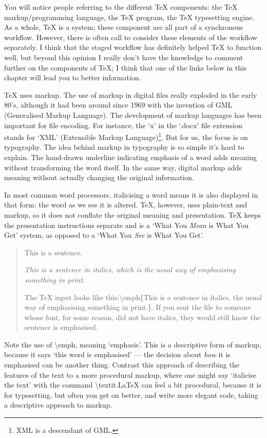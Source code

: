 \documentclass[11pt, oneside]{memoir}
\begin{document}
You will notice people referring to the different TeX components: the TeX markup/programming language, the TeX program, the TeX typesetting engine. As a whole, TeX is a system; these component are all part of a synchronous workflow. However, there is often call to consider these elements of the workflow separately. I think that the staged workflow has definitely helped TeX to function well, but beyond this opinion I really don't have the knowledge to comment further on the components of TeX; I think that one of the links below in this chapter will lead you to better information.

TeX uses markup. The use of markup in digital files really exploded in the early 80's, although it had been around since 1969 with the invention of GML (Generalised Markup Language). The development of markup languages has been important for file encoding. For instance, the `x' in the `.docx' file extension stands for `XML' (Extensible Markup Language)\footnote{XML is a descendant of GML.}. But for us, the focus is on typography. The idea behind markup in typography is so simple it's hard to explain. The hand-drawn underline indicating emphasis of a word adds meaning without transforming the word itself. In the same way, digital markup adds meaning without actually changing the original information. 

In most common word processors, italicising a word means it is also displayed in that form: the word as we see it is altered. TeX, however, uses plain-text and markup, so it does not conflate the original meaning and presentation. TeX keeps the presentation instructions separate and is a `What You \emph{Mean} is What You Get' system, as opposed to a `What You \emph{See} is What You Get'.

\begin{quotation}
This is a sentence. 

\emph{This is a sentence in italics, which is the usual way of emphasising something in print.}

The TeX input looks like this:\gc \textbackslash emph\{This is a sentence in italics, the usual way of emphasising something in print.\}. \normalfont If you sent the file to someone whose font, for some reason, did not have italics, they would still know the sentence is emphasised.
\end{quotation}

Note the use of \gc \textbackslash emph\normalfont , meaning `emphasis'. This is a descriptive form of markup, because it says `this word is emphasised' — the decision about \emph{how} it is emphasised can be another thing. Contrast this approach of describing the features of the text to a more procedural markup, where one might say `italicise the text' with the command \gc \textbackslash textit.\normalfont LaTeX can feel a bit procedural, because it is for typesetting, but often you get on better, and write more elegant code, taking a descriptive approach to markup.
\end{document}
